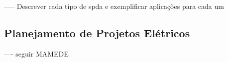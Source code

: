 ----- Descrever cada tipo de spda e exemplificar aplicações para cada um


\subsection{Planejamento de Projetos Elétricos}

---- seguir MAMEDE

